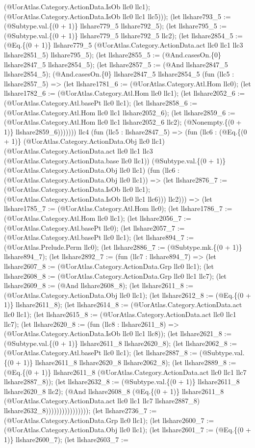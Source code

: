 \documentclass[11pt]{article}
\begin{document}
(@UorAtlas.Category.ActionData.IsOb llc0 llc1); (@UorAtlas.Category.ActionData.IsOb llc0 llc1 llc5))); (let llshare793\_5 := (@Subtype.val.\{(0 + 1)\} llshare779\_5 llshare792\_5); (let llshare795\_5 := (@Subtype.val.\{(0 + 1)\} llshare779\_5 llshare792\_5 llc2); (let llshare2854\_5 := (@Eq.\{(0 + 1)\} llshare779\_5 (@UorAtlas.Category.ActionData.act llc0 llc1 llc3 llshare2851\_5) llshare795\_5); (let llshare2855\_5 := (@And.casesOn.\{0\} llshare2847\_5 llshare2854\_5); (let llshare2857\_5 := (@And llshare2847\_5 llshare2854\_5); (@And.casesOn.\{0\} llshare2847\_5 llshare2854\_5 (fun (llc5 : llshare2857\_5) => (let llshare1781\_6 := (@UorAtlas.Category.Atl.Hom llc0); (let llshare1782\_6 := (@UorAtlas.Category.Atl.Hom llc0 llc1); (let llshare2052\_6 := (@UorAtlas.Category.Atl.basePt llc0 llc1); (let llshare2858\_6 := (@UorAtlas.Category.Atl.Hom llc0 llc1 llshare2052\_6); (let llshare2859\_6 := (@UorAtlas.Category.Atl.Hom llc0 llc1 llshare2052\_6 llc2); (@Nonempty.\{(0 + 1)\} llshare2859\_6))))))) llc4 (fun (llc5 : llshare2847\_5) => (fun (llc6 : (@Eq.\{(0 + 1)\} (@UorAtlas.Category.ActionData.Obj llc0 llc1) (@UorAtlas.Category.ActionData.act llc0 llc1 llc3 (@UorAtlas.Category.ActionData.base llc0 llc1)) (@Subtype.val.\{(0 + 1)\} (@UorAtlas.Category.ActionData.Obj llc0 llc1) (fun (llc6 : (@UorAtlas.Category.ActionData.Obj llc0 llc1)) => (let llshare2876\_7 := (@UorAtlas.Category.ActionData.IsOb llc0 llc1); (@UorAtlas.Category.ActionData.IsOb llc0 llc1 llc6))) llc2))) => (let llshare1785\_7 := (@UorAtlas.Category.Atl.Hom llc0); (let llshare1786\_7 := (@UorAtlas.Category.Atl.Hom llc0 llc1); (let llshare2056\_7 := (@UorAtlas.Category.Atl.basePt llc0); (let llshare2057\_7 := (@UorAtlas.Category.Atl.basePt llc0 llc1); (let llshare894\_7 := (@UorAtlas.Prelude.Perm llc0); (let llshare2886\_7 := (@Subtype.mk.\{(0 + 1)\} llshare894\_7); (let llshare2892\_7 := (fun (llc7 : llshare894\_7) => (let llshare2607\_8 := (@UorAtlas.Category.ActionData.Grp llc0 llc1); (let llshare2608\_8 := (@UorAtlas.Category.ActionData.Grp llc0 llc1 llc7); (let llshare2609\_8 := (@And llshare2608\_8); (let llshare2611\_8 := (@UorAtlas.Category.ActionData.Obj llc0 llc1); (let llshare2612\_8 := (@Eq.\{(0 + 1)\} llshare2611\_8); (let llshare2614\_8 := (@UorAtlas.Category.ActionData.act llc0 llc1); (let llshare2615\_8 := (@UorAtlas.Category.ActionData.act llc0 llc1 llc7); (let llshare2620\_8 := (fun (llc8 : llshare2611\_8) => (@UorAtlas.Category.ActionData.IsOb llc0 llc1 llc8)); (let llshare2621\_8 := (@Subtype.val.\{(0 + 1)\} llshare2611\_8 llshare2620\_8); (let llshare2062\_8 := (@UorAtlas.Category.Atl.basePt llc0 llc1); (let llshare2887\_8 := (@Subtype.val.\{(0 + 1)\} llshare2611\_8 llshare2620\_8 llshare2062\_8); (let llshare2889\_8 := (@Eq.\{(0 + 1)\} llshare2611\_8 (@UorAtlas.Category.ActionData.act llc0 llc1 llc7 llshare2887\_8)); (let llshare2632\_8 := (@Subtype.val.\{(0 + 1)\} llshare2611\_8 llshare2620\_8 llc2); (@And llshare2608\_8 (@Eq.\{(0 + 1)\} llshare2611\_8 (@UorAtlas.Category.ActionData.act llc0 llc1 llc7 llshare2887\_8) llshare2632\_8)))))))))))))))); (let llshare2736\_7 := (@UorAtlas.Category.ActionData.Grp llc0 llc1); (let llshare2600\_7 := (@UorAtlas.Category.ActionData.Obj llc0 llc1); (let llshare2601\_7 := (@Eq.\{(0 + 1)\} llshare2600\_7); (let llshare2603\_7 := 
\end{document}
